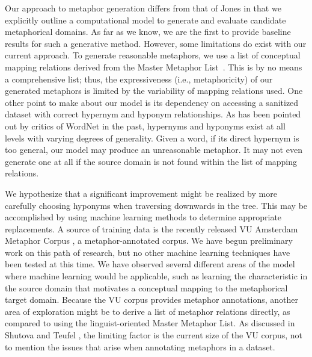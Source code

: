 \documentclass[12pt]{article}
\begin{document}
Our approach to metaphor generation differs from that of Jones \cite{jones92} in that we explicitly outline a computational model to generate and evaluate candidate metaphorical domains. As far as we know, we are the first to provide baseline results for such a generative method. However, some limitations do exist with our current approach. To generate reasonable metaphors, we use a list of conceptual mapping relations derived from the Master Metaphor List~\cite{lakoff89}. This is by no means a comprehensive list; thus, the expressiveness (i.e., metaphoricity) of our generated metaphors is limited by the variability of mapping relations used. One other point to make about our model is its dependency on accessing a sanitized dataset with correct hypernym and hyponym relationships. As has been pointed out by critics of WordNet in the past, hypernyms and hyponyms exist at all levels with varying degrees of generality. Given a word, if its direct hypernym is too general, our model may produce an unreasonable metaphor. It may not even generate one at all if the source domain is not found within the list of mapping relations.

We hypothesize that a significant improvement might be realized by more carefully choosing hyponyms when traversing downwards in the tree.  This may be accomplished by using machine learning methods to determine appropriate replacements. A source of training data is the recently released VU Amsterdam Metaphor Corpus \cite{steen12}, a metaphor-annotated corpus. We have begun preliminary work on this path of research, but no other machine learning techniques have been tested at this time. We have observed several different areas of the model where machine learning would be applicable, such as learning the characteristic in the source domain that motivates a conceptual mapping to the metaphorical target domain. Because the VU corpus provides metaphor annotations, another area of exploration might be to derive a list of metaphor relations directly, as compared to using the linguist-oriented Master Metaphor List.  As discussed in Shutova and Teufel \cite{shutova103}, the limiting factor is the current size of the VU corpus, not to mention the issues that arise when annotating metaphors in a dataset.
\end{document}
